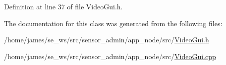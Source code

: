 Definition at line 37 of file Video\-Gui.\-h.



The documentation for this class was generated from the following files\-:\begin{DoxyCompactItemize}
\item 
/home/james/se\-\_\-ws/src/sensor\-\_\-admin/app\-\_\-node/src/\hyperlink{app__node_2src_2_video_gui_8h}{Video\-Gui.\-h}\item 
/home/james/se\-\_\-ws/src/sensor\-\_\-admin/app\-\_\-node/src/\hyperlink{app__node_2src_2_video_gui_8cpp}{Video\-Gui.\-cpp}\end{DoxyCompactItemize}
